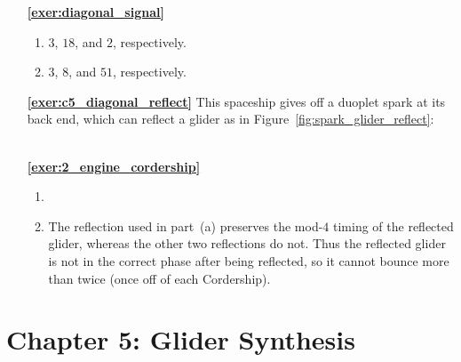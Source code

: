 \begin{multicols}{2}
\begin{itemize}[leftmargin=0em]
	
	\item[\bf\color{ocre}\sffamily\ref{exer:diagonal_signal}]
	\begin{enumerate}[leftmargin=1.5em,label=\bf\color{ocre}(\alph*)]
		\item $3$, $18$, and $2$, respectively. \\
		
		\item $3$, $8$, and $51$, respectively. \\
	\end{enumerate}
	
	
	\item[\bf\color{ocre}\sffamily\ref{exer:c5_diagonal_reflect}] This spaceship gives off a duoplet spark at its back end, which can reflect a glider as in Figure~\ref{fig:spark_glider_reflect}: \\[-0.6em]
	
	 \\
	
	
	\item[\bf\color{ocre}\sffamily\ref{exer:2_engine_cordership}]
	\begin{enumerate}[leftmargin=1.5em,label=\bf\color{ocre}(\alph*)]
		\item {} \\
		
		\item The reflection used in part~(a) preserves the mod-$4$ timing of the reflected glider, whereas the other two reflections do not. Thus the reflected glider is not in the correct phase after being reflected, so it cannot bounce more than twice (once off of each Cordership). \\
	\end{enumerate}
	\end{itemize}
\end{multicols}


\hypertarget{solutions_glider_synthesis}{}\label{solutions_glider_synthesis}
\section*{Chapter 5: Glider Synthesis}
\renewcommand{\chapterfolder}{glider_synthesis/}

